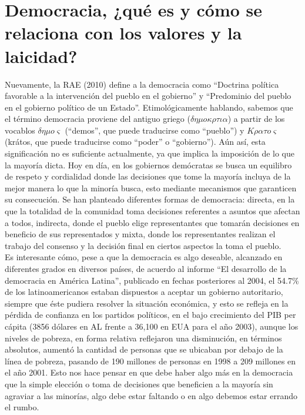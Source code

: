 \documentclass[12pt]{book} %
\begin{document}
\section{Democracia, ¿qué es y cómo se relaciona con los valores y la laicidad?}
Nuevamente, la RAE (2010) define a la democracia como “Doctrina política favorable a la intervención del pueblo en el gobierno” y “Predominio del pueblo en el gobierno político de un Estado”. Etimológicamente hablando, sabemos que el término democracia proviene del antiguo griego ($\delta\eta\mu o\kappa\rho\tau\iota\alpha$) a partir de los vocablos $\delta\eta\mu o\varsigma$ (``demos'', que puede traducirse como ``pueblo'') y $K\rho\alpha\tau o\varsigma$ (krátos, que puede traducirse como ``poder'' o ``gobierno''). Aún así, esta significación no es suficiente actualmente, ya que implica la imposición de lo que la mayoría dicta. Hoy en día, en los gobiernos demócratas se busca un equilibro de respeto y cordialidad donde las decisiones que tome la mayoría incluya de la mejor manera lo que la minoría busca, esto mediante mecanismos que garanticen su consecución. Se han planteado diferentes formas de democracia: directa, en la que la totalidad de la comunidad toma decisiones referentes a asuntos que afectan a todos, indirecta, donde el pueblo elige representantes que tomarán decisiones en beneficio de sus representados y mixta, donde los representantes realizan el trabajo del consenso y la decisión final en ciertos aspectos la toma el pueblo.\\

Es interesante cómo, pese a que la democracia es algo deseable, alcanzado en diferentes grados en diversos países, de acuerdo al informe “El desarrollo de la democracia en América Latina”, publicado en fechas posteriores al 2004, el 54.7\% de los latinoamericanos estaban dispuestos a aceptar un gobierno autoritario, siempre que éste pudiera resolver la situación económica, y esto se refleja en la pérdida de confianza en los partidos políticos, en el bajo crecimiento del PIB per cápita (3856 dólares en AL frente a 36,100 en EUA para el año 2003), aunque los niveles de pobreza, en forma relativa reflejaron una disminución, en términos absolutos, aumentó la cantidad de personas que se ubicaban por debajo de la línea de pobreza, pasando de 190 millones de personas en 1998 a 209 millones en el año 2001. Esto nos hace pensar en que debe haber algo más en la democracia que la simple elección o toma de decisiones que beneficien a la mayoría sin agraviar a las minorías, algo debe estar faltando o en algo debemos estar errando el rumbo.\\
\end{document}

